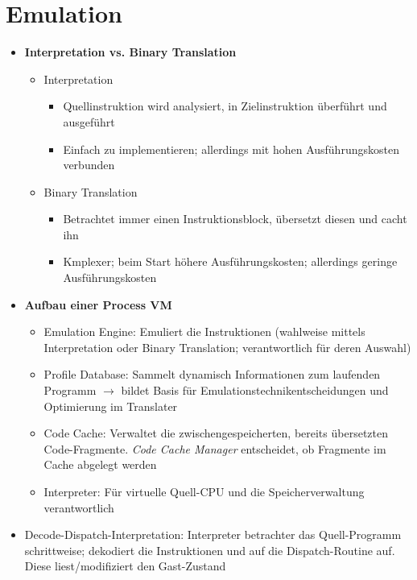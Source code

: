 \section{Emulation}
\begin{itemize}
	\item \textbf{Interpretation vs. Binary Translation}
	\begin{itemize}
		\item Interpretation
		\begin{itemize}
			\item Quellinstruktion wird analysiert, in Zielinstruktion überführt und ausgeführt
			\item Einfach zu implementieren; allerdings mit hohen Ausführungskosten verbunden
		\end{itemize}
		\item Binary Translation
		\begin{itemize}
			\item Betrachtet immer einen Instruktionsblock, übersetzt diesen und cacht ihn
			\item Kmplexer; beim Start höhere Ausführungskosten; allerdings geringe Ausführungskosten
		\end{itemize}
	\end{itemize}
	\item \textbf{Aufbau einer Process VM}
	\begin{itemize}
		\item Emulation Engine: Emuliert die Instruktionen (wahlweise mittels Interpretation oder Binary Translation; verantwortlich für deren Auswahl)
		\item Profile Database: Sammelt dynamisch Informationen zum laufenden Programm \(\rightarrow\) bildet Basis für Emulationstechnikentscheidungen und Optimierung im Translater
		\item Code Cache: Verwaltet die zwischengespeicherten, bereits übersetzten Code-Fragmente. \textit{Code Cache Manager} entscheidet, ob Fragmente im Cache abgelegt werden
		\item Interpreter: Für virtuelle Quell-CPU und die Speicherverwaltung verantwortlich
	\end{itemize}
	\item Decode-Dispatch-Interpretation: Interpreter betrachter das Quell-Programm schrittweise; dekodiert die Instruktionen und auf die Dispatch-Routine auf. Diese liest/modifiziert den Gast-Zustand
\end{itemize}